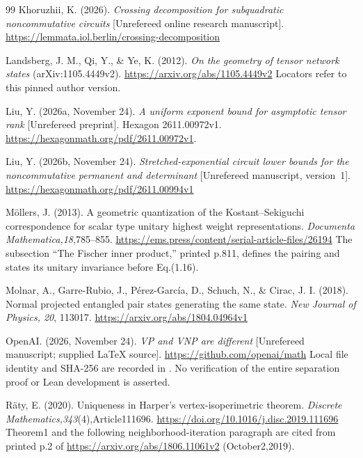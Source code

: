\begin{thebibliography}{99}
Khoruzhii, K. (2026). \emph{Crossing decomposition for subquadratic
noncommutative circuits} [Unrefereed online research manuscript].
\url{https://lemmata.iol.berlin/crossing-decomposition}

Landsberg, J. M., Qi, Y., \& Ye, K. (2012).
\emph{On the geometry of tensor network states}
(arXiv:1105.4449v2). \url{https://arxiv.org/abs/1105.4449v2}
Locators refer to this pinned author version.

Liu, Y. (2026a, November 24). \emph{A uniform exponent bound for
asymptotic tensor rank} [Unrefereed preprint]. Hexagon 2611.00972v1.
\url{https://hexagonmath.org/pdf/2611.00972v1}.

Liu, Y. (2026b, November 24). \emph{Stretched-exponential circuit lower
bounds for the noncommutative permanent and determinant}
[Unrefereed manuscript, version~1].
\url{https://hexagonmath.org/pdf/2611.00994v1}

M\"ollers, J. (2013). A geometric quantization of the Kostant--Sekiguchi
correspondence for scalar type unitary highest weight representations.
\emph{Documenta Mathematica,18},785--855.
\url{https://ems.press/content/serial-article-files/26194}
The subsection ``The Fischer inner product,'' printed p.811,
defines the pairing and states its unitary invariance before Eq.(1.16).

Molnar, A., Garre-Rubio, J., P\'erez-Garc\'ia, D., Schuch, N.,
\& Cirac, J. I. (2018).
Normal projected entangled pair states generating the same state.
\emph{New Journal of Physics, 20}, 113017.
\url{https://arxiv.org/abs/1804.04964v1}

OpenAI. (2026, November 24). \emph{VP and VNP are different}
[Unrefereed manuscript; supplied LaTeX source].
\url{https://github.com/openai/math}
Local file identity and SHA-256 are recorded in
. No verification of the entire separation
proof or Lean development is asserted.

R\"aty, E. (2020). Uniqueness in Harper's vertex-isoperimetric theorem.
\emph{Discrete Mathematics,343}(4),Article111696.
\url{https://doi.org/10.1016/j.disc.2019.111696}
Theorem1 and the following neighborhood-iteration paragraph are cited
from printed p.2 of \url{https://arxiv.org/abs/1806.11061v2}
(October2,2019).


\end{thebibliography}
